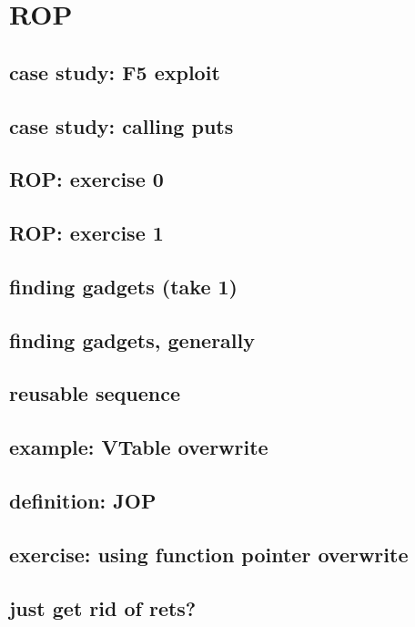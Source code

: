 \graphicspath{{./figures/}}
\title{}
\date{}

\begin{frame}
    \titlepage
\end{frame}


\usetikzlibrary{arrows.meta,positioning}


\section{ROP}


\subsection{case study: F5 exploit}


\subsection{case study: calling puts}


\subsection{ROP: exercise 0}


\subsection{ROP: exercise 1}


\subsection{finding gadgets (take 1)}


\subsection{finding gadgets, generally}



\subsection{reusable sequence}


\subsection{example: VTable overwrite}



\subsection{definition: JOP}



\subsection{exercise: using function pointer overwrite}


\subsection{just get rid of rets?}



